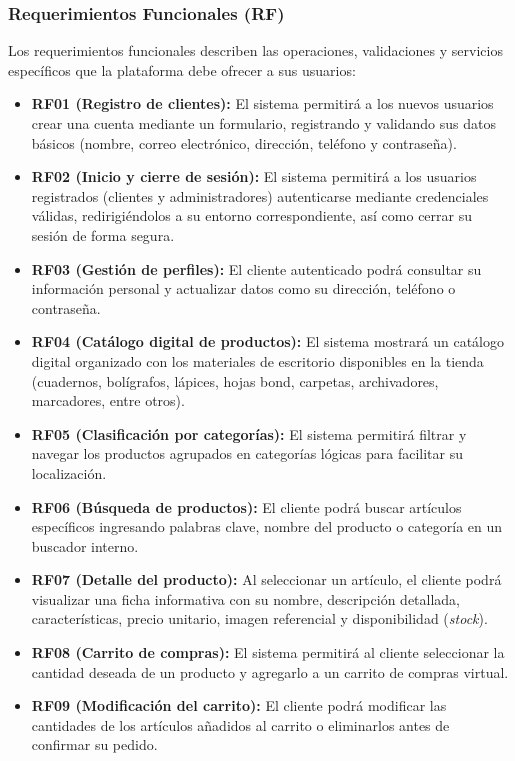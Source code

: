 \subsubsection{Requerimientos Funcionales (RF)}

Los requerimientos funcionales describen las operaciones, validaciones y servicios específicos que la plataforma debe ofrecer a sus usuarios:

\begin{itemize}
    \item \textbf{RF01 (Registro de clientes):} El sistema permitirá a los nuevos usuarios crear una cuenta mediante un formulario, registrando y validando sus datos básicos (nombre, correo electrónico, dirección, teléfono y contraseña).
    \item \textbf{RF02 (Inicio y cierre de sesión):} El sistema permitirá a los usuarios registrados (clientes y administradores) autenticarse mediante credenciales válidas, redirigiéndolos a su entorno correspondiente, así como cerrar su sesión de forma segura.
    \item \textbf{RF03 (Gestión de perfiles):} El cliente autenticado podrá consultar su información personal y actualizar datos como su dirección, teléfono o contraseña.
    \item \textbf{RF04 (Catálogo digital de productos):} El sistema mostrará un catálogo digital organizado con los materiales de escritorio disponibles en la tienda (cuadernos, bolígrafos, lápices, hojas bond, carpetas, archivadores, marcadores, entre otros).
    \item \textbf{RF05 (Clasificación por categorías):} El sistema permitirá filtrar y navegar los productos agrupados en categorías lógicas para facilitar su localización.
    \item \textbf{RF06 (Búsqueda de productos):} El cliente podrá buscar artículos específicos ingresando palabras clave, nombre del producto o categoría en un buscador interno.
    \item \textbf{RF07 (Detalle del producto):} Al seleccionar un artículo, el cliente podrá visualizar una ficha informativa con su nombre, descripción detallada, características, precio unitario, imagen referencial y disponibilidad (\textit{stock}).
    \item \textbf{RF08 (Carrito de compras):} El sistema permitirá al cliente seleccionar la cantidad deseada de un producto y agregarlo a un carrito de compras virtual.
    \item \textbf{RF09 (Modificación del carrito):} El cliente podrá modificar las cantidades de los artículos añadidos al carrito o eliminarlos antes de confirmar su pedido.

\end{itemize}
